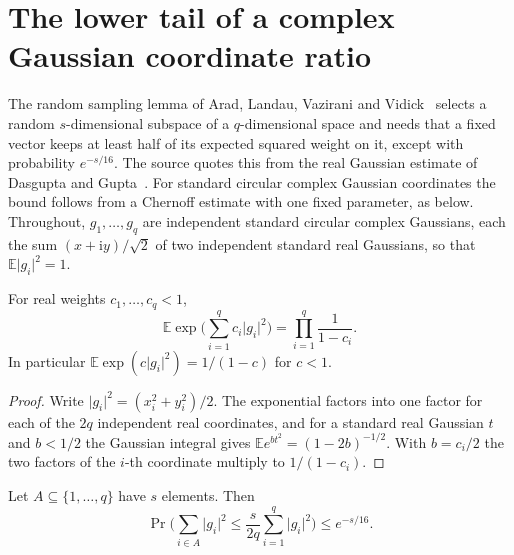 \section{The lower tail of a complex Gaussian coordinate ratio}

The random sampling lemma of Arad, Landau, Vazirani and
Vidick~\cite[lines 531--547]{Arad2016RigorousRG} selects a random
$s$-dimensional subspace of a $q$-dimensional space and needs that a fixed
vector keeps at least half of its expected squared weight on it, except with
probability $e^{-s/16}$. The source quotes this from the real Gaussian
estimate of Dasgupta and Gupta~\cite[Theorem~2.1]{Dasgupta2003ElementaryJL}.
For standard circular complex Gaussian coordinates the bound follows from a
Chernoff estimate with one fixed parameter, as below. Throughout,
$g_1,\dots,g_q$ are independent standard circular complex Gaussians, each the
sum $(x+\mathrm{i}y)/\sqrt2$ of two independent standard real Gaussians, so
that $\mathbb E\lvert g_i\rvert^2=1$.

\begin{theorem}
    \label{thm:complex_gaussian_norm_sq_mgf}
    \leanok
    For real weights $c_1,\dots,c_q<1$,
    \[
        \mathbb E\exp\Big(\sum_{i=1}^q c_i\lvert g_i\rvert^2\Big)
        =\prod_{i=1}^q\frac1{1-c_i}.
    \]
    In particular $\mathbb E\exp(c\lvert g_i\rvert^2)=1/(1-c)$ for $c<1$.
\end{theorem}

\begin{proof}
    \leanok
    Write $\lvert g_i\rvert^2=(x_i^2+y_i^2)/2$. The exponential factors into
    one factor for each of the $2q$ independent real coordinates, and for a
    standard real Gaussian $t$ and $b<1/2$ the Gaussian integral gives
    $\mathbb E e^{bt^2}=(1-2b)^{-1/2}$. With $b=c_i/2$ the two factors of the
    $i$-th coordinate multiply to $1/(1-c_i)$.
\end{proof}

\begin{theorem}
    \label{thm:complex_gaussian_ratio_lower_tail}
    \leanok
    Let $A\subseteq\{1,\dots,q\}$ have $s$ elements. Then
    \[
        \Pr\Big(\sum_{i\in A}\lvert g_i\rvert^2
        \le\frac{s}{2q}\sum_{i=1}^q\lvert g_i\rvert^2\Big)\le e^{-s/16}.
    \]
\end{theorem}

